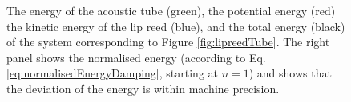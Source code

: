 \begin{figure}[h]
    \centering
      \caption{The energy of the acoustic tube (green), the potential energy (red) the kinetic energy of the lip reed (blue), and the total energy (black) of the system corresponding to Figure \ref{fig:lipreedTube}. The right panel shows the normalised energy (according to Eq. \eqref{eq:normalisedEnergyDamping}, starting at $n=1$) and shows that the deviation of the energy is within machine precision. \label{fig:lipReedEnergy}}
\end{figure}

